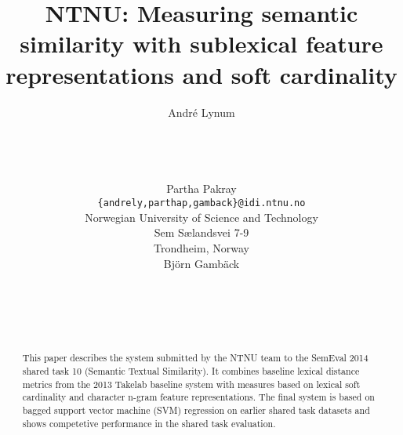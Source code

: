 \documentclass[11pt]{article}
\title{NTNU: Measuring semantic similarity with sublexical feature representations and soft cardinality}
\author{Andr\'{e} Lynum \\
  \\
  \\
  \\
  \\
  \And
  Partha Pakray \\
  {\tt \{andrely,parthap,gamback\}@idi.ntnu.no} \\
  Norwegian University of Science and Technology \\
  Sem S{\ae}landsvei 7-9 \\
  Trondheim, Norway \\
  \And
  Bj\"{o}rn Gamb\"{a}ck \\
  \\
  \\
  \\
  \\
}
\date{}
\begin{document}
\maketitle
\begin{abstract}
  This paper describes the system submitted by the NTNU team to the SemEval 2014 shared task 10 (Semantic Textual Similarity). It combines baseline lexical distance metrics from the 2013 Takelab baseline system with measures based on lexical soft cardinality and character n-gram feature representations. The final system is based on bagged support vector machine (SVM) regression on earlier shared task datasets and shows competetive performance in the shared task evaluation.
\end{abstract}
















\end{document}
